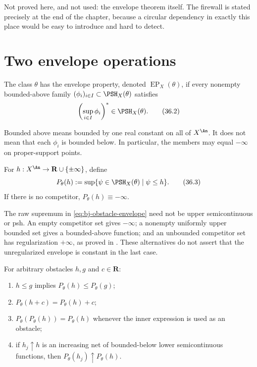 Not proved here, and not used: the envelope theorem itself.  The firewall is
stated precisely at the end of the chapter, because a circular dependency in
exactly this place would be easy to introduce and hard to detect.

\section{Two envelope operations}

\begin{definition}
\label{def:bj-envelope-property}
The class $\theta$ has the envelope property, denoted
$\operatorname{EP}_X(\theta)$, if every nonempty bounded-above family
$(\phi_i)_{i\in I}\subset\PSH_X(\theta)$ satisfies
\[
                        \left(\sup_{i\in I}\phi_i\right)^*
                              \in\PSH_X(\theta).
\tag{36.2}\label{eq:bj-envelope-property}
\]
\end{definition}

Bounded above means bounded by one real constant on all of $X^{\An}$.
It does not mean that each $\phi_i$ is bounded below.  In particular, the
members may equal $-\infty$ on proper-support points.

\begin{definition}
\label{def:bj-obstacle-envelope}
For $h:X^{\An}\to\mathbf R\cup\{\pm\infty\}$, define
\[
 P_\theta(h):=
 \sup\{\psi\in\PSH_X(\theta)\mid\psi\leq h\}.
\tag{36.3}\label{eq:bj-obstacle-envelope}
\]
If there is no competitor, $P_\theta(h)\equiv-\infty$.
\end{definition}

The raw supremum in \eqref{eq:bj-obstacle-envelope} need not be upper
semicontinuous or psh. An empty competitor set gives $-\infty$; a nonempty
uniformly upper bounded set gives a bounded-above function; and an
unbounded competitor set has regularization $+\infty$, as proved in
. These alternatives do not assert that
the unregularized envelope is constant in the last case.

\begin{lemma}\label{lem:obstacle-envelope-formal}
For arbitrary obstacles $h,g$ and $c\in\mathbf R$:
\begin{enumerate}
\item $h\leq g$ implies $P_\theta(h)\leq P_\theta(g)$;
\item $P_\theta(h+c)=P_\theta(h)+c$;
\item $P_\theta(P_\theta(h))=P_\theta(h)$ whenever the inner expression
      is used as an obstacle;
\item if $h_j\uparrow h$ is an increasing net of bounded-below lower
      semicontinuous functions, then
      $P_\theta(h_j)\uparrow P_\theta(h)$.
\end{enumerate}
\par
\end{lemma}

